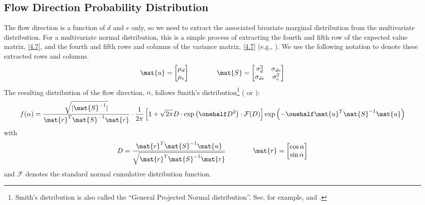 \documentclass[12pt]{article}
\begin{document}
\subsection{Flow Direction Probability Distribution}
The flow direction is a function of $d$ and $e$ only, so we need to extract the associated bivariate marginal distribution from the multivariate distribution. For a multivariate normal distribution, this is a simple process of extracting the fourth and fifth row of the expected value matrix, \eqref{4.7}, and the fourth and fifth rows and columns of the variance matrix, \eqref{4.7} (e.g., \citet[Section 18.2, Theorem 3]{Roussas1973}). We use the following notation to denote these extracted rows and columns.
%
\begin{equation}\label{5.2}
    \mat{u} = \begin{bmatrix} \mu_{d} \\ \mu_{e} \end{bmatrix}
    \qquad \qquad
    \mat{S} = \begin{bmatrix} \sigma_{d}^2 & \sigma_{de} \\ \sigma_{de} & \sigma_{e}^2 \end{bmatrix}
\end{equation}
%
The resulting distribution of the flow direction, $\alpha$, follows Smith's distribution\footnote{Smith's distribution is also called the ``General Projected Normal distribution''. See, for example, \citet{Lark2014} and \citet{Hernandez2017}.} (\citet[Equation (4-11)]{Justus1978} or \citet[Equation (6)]{Carta2008}):
%
\begin{equation}\label{5.3}
	f(\alpha) =
    	\dfrac{\sqrt{|\mat{S}^{-1}|}}{\mat{r}^T \mat{S}^{-1} \mat{r}}
	\cdot \frac{1}{2\pi} \left[ 1 + \sqrt{2\pi} D \cdot \exp{\left(\onehalf D^2\right)} \cdot \mathcal{F}(D) \right]
	\exp{\left(-\onehalf \mat{u}^T \mat{S}^{-1} \mat{u} \right)}
\end{equation}
%
with
%
\begin{equation}\label{5.4}
	D = \frac{\mat{r}^T \mat{S}^{-1} \mat{u}}{\sqrt{\mat{r}^T \mat{S}^{-1} \mat{r} }}
    \qquad \qquad
    \mat{r} = \begin{bmatrix}\cos{\alpha} \\ \sin{\alpha}\end{bmatrix}
\end{equation}
%
and $\mathcal{F}$ denotes the standard normal cumulative distribution function.
\end{document}
